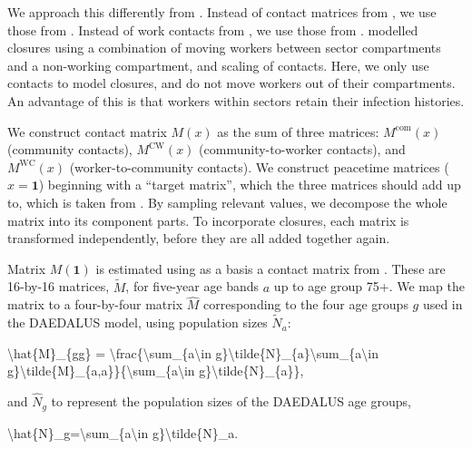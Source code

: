 \documentclass[
]{article}
\newenvironment{Shaded}{\begin{snugshade}}{\end{snugshade}}
\newcommand{\NormalTok}[1]{#1}
\begin{document}
We approach this differently from \citep{Haw2020}. Instead of contact matrices from \citep{Prem2021}, we use those from \citep{Walker2020}. Instead of work contacts from \citep{Beraud2015}, we use those from \citep{Jarvis2023}. \citep{Haw2020} modelled closures using a combination of moving workers between sector compartments and a non-working compartment, and scaling of contacts. Here, we only use contacts to model closures, and do not move workers out of their compartments. An advantage of this is that workers within sectors retain their infection histories.

We construct contact matrix \(M(x)\) as the sum of three matrices: \(M^{\text{com}}(x)\) (community contacts), \(M^{\text{CW}}(x)\) (community-to-worker contacts), and \(M^{\text{WC}}(x)\) (worker-to-community contacts). We construct peacetime matrices (\(x=\textbf{1}\)) beginning with a ``target matrix'', which the three matrices should add up to, which is taken from \citep{Walker2020}. By sampling relevant values, we decompose the whole matrix into its component parts. To incorporate closures, each matrix is transformed independently, before they are all added together again.

Matrix \(M(\textbf{1})\) is estimated using as a basis a contact matrix from \citep{Walker2020}. These are 16-by-16 matrices, \(\tilde{M}\), for five-year age bands \(a\) up to age group 75+. We map the matrix to a four-by-four matrix \(\hat{M}\) corresponding to the four age groups \(g\) used in the DAEDALUS model, using population sizes \(\tilde{N}_a\):

\begin{Shaded}
\begin{Highlighting}[]
\NormalTok{\textbackslash{}hat\{M\}\_\{gg\textquotesingle{}\} = \textbackslash{}frac\{\textbackslash{}sum\_\{a\textbackslash{}in g\}\textbackslash{}tilde\{N\}\_\{a\}\textbackslash{}sum\_\{a\textquotesingle{}\textbackslash{}in g\textquotesingle{}\}\textbackslash{}tilde\{M\}\_\{a,a\textquotesingle{}\}\}\{\textbackslash{}sum\_\{a\textbackslash{}in g\}\textbackslash{}tilde\{N\}\_\{a\}\},}
\end{Highlighting}
\end{Shaded}

and \(\hat{N}_g\) to represent the population sizes of the DAEDALUS age groups,

\begin{Shaded}
\begin{Highlighting}[]
\NormalTok{\textbackslash{}hat\{N\}\_g=\textbackslash{}sum\_\{a\textbackslash{}in g\}\textbackslash{}tilde\{N\}\_a.}
\end{Highlighting}
\end{Shaded}
\end{document}
